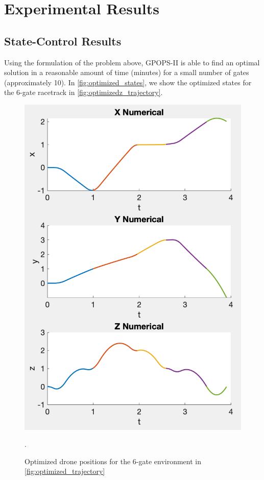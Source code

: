 
\section{Experimental Results}
\label{sec:results}

\subsection{State-Control Results}
Using the formulation of the problem above, \textrm{GPOPS-II} is able to find an optimal solution in a reasonable amount of time (minutes) for a small number of gates (approximately 10).
In \cref{fig:optimized_states}, we show the optimized states for the 6-gate racetrack in \cref{fig:optimizedz_trajectory}.

\begin{figure}[htbp]
  \centering
  \includegraphics[width=1.0\columnwidth]{img/position.png}
  \caption{Optimized drone positions for the 6-gate environment in \cref{fig:optimized_trajectory}}.
  \label{fig:optimized_position}
\end{figure}

